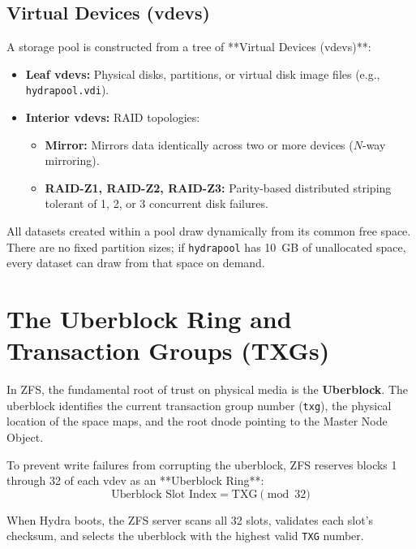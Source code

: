 \subsection{Virtual Devices (vdevs)}
A storage pool is constructed from a tree of **Virtual Devices (vdevs)**:
\begin{itemize}
    \item \textbf{Leaf vdevs:} Physical disks, partitions, or virtual disk image files (e.g., \texttt{hydrapool.vdi}).
    \item \textbf{Interior vdevs:} RAID topologies:
    \begin{itemize}
        \item \textbf{Mirror:} Mirrors data identically across two or more devices ($N$-way mirroring).
        \item \textbf{RAID-Z1, RAID-Z2, RAID-Z3:} Parity-based distributed striping tolerant of 1, 2, or 3 concurrent disk failures.
    \end{itemize}
\end{itemize}

All datasets created within a pool draw dynamically from its common free space. There are no fixed partition sizes; if \texttt{hydrapool} has 10~GB of unallocated space, every dataset can draw from that space on demand.

\section{The Uberblock Ring and Transaction Groups (TXGs)}
\label{sec:uberblock_ring}

In ZFS, the fundamental root of trust on physical media is the \textbf{Uberblock}. The uberblock identifies the current transaction group number (\texttt{txg}), the physical location of the space maps, and the root dnode pointing to the Master Node Object.

To prevent write failures from corrupting the uberblock, ZFS reserves blocks 1 through 32 of each vdev as an **Uberblock Ring**:
\begin{equation}
\text{Uberblock Slot Index} = \text{TXG} \pmod{32}
\end{equation}

When Hydra boots, the ZFS server scans all 32 slots, validates each slot's checksum, and selects the uberblock with the highest valid \texttt{TXG} number.

